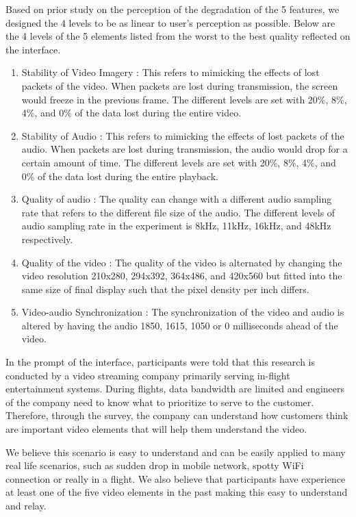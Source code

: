 Based on prior study on the perception of 
the degradation of the 5 features, 
we designed the 4 levels to be as linear 
to user's perception as possible. 
Below are the 4 levels of the 5 elements 
listed from the worst to the best quality
reflected on the interface.

\begin{enumerate}
    \item Stability of Video Imagery \cite{claypool1999effects}: This refers to mimicking the effects of lost packets of the video. When packets are lost during transmission, the screen would freeze in the previous frame. The different levels are set with 20\%, 8\%, 4\%, and 0\% of the data lost during the entire video.
    \item Stability of Audio \cite{claypool1999effects}: This refers to mimicking the effects of lost packets of the audio. When packets are lost during transmission, the audio would drop for a certain amount of time. The different levels are set with 20\%, 8\%, 4\%, and 0\% of the data lost during the entire playback.
    \item Quality of audio \cite{oeldorf2012bad, noll1993wideband}: The quality can change with a different audio sampling rate that refers to the different file size of the audio. The different levels of audio sampling rate in the experiment is 8kHz, 11kHz, 16kHz, and 48kHz respectively.
    \item Quality of the video \cite{oeldorf2012bad, knoche2008low}: The quality of the video is alternated by changing the video resolution 210x280, 294x392, 364x486, and 420x560 but fitted into the same size of final display such that the pixel density per inch differs.
    \item Video-audio Synchronization \cite{steinmetz1996human}: The synchronization of the video and audio is altered by having the audio 1850, 1615, 1050 or 0 milliseconds ahead of the video.
\end{enumerate}

In the prompt of the interface, 
participants were told that this research 
is conducted by a video streaming company
primarily serving in-flight entertainment systems.
During flights,
data bandwidth are limited and engineers 
of the company need to know what to prioritize
to serve to the customer.
Therefore, through the survey,
the company can understand 
how customers think are important video elements
that will help them understand the video.

We believe this scenario is easy to understand 
and can be easily applied to many real life scenarios,
such as sudden drop in mobile network,
spotty WiFi connection
or really in a flight.
We also believe that participants 
have experience at least one of the five
video elements in the past
making this easy to understand and relay.


